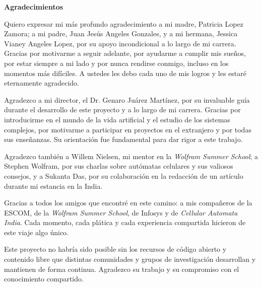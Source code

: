 \thispagestyle{empty}

\vspace*{1cm}
{\centering \Large \textbf{Agradecimientos}\par}
\vspace{0.8cm}

Quiero expresar mi más profundo agradecimiento a mi madre, Patricia Lopez Zamora; a mi padre, Juan Jesús Angeles Gonzales, y a mi hermana, Jessica Vianey Angeles Lopez, por su apoyo incondicional a lo largo de mi carrera. Gracias por motivarme a seguir adelante, por ayudarme a cumplir mis sueños, por estar siempre a mi lado y por nunca rendirse conmigo, incluso en los momentos más difíciles. A ustedes les debo cada uno de mis logros y les estaré eternamente agradecido.

Agradezco a mi director, el Dr. Genaro Juárez Martínez, por su invaluable guía durante el desarrollo de este proyecto y a lo largo de mi carrera. Gracias por introducirme en el mundo de la vida artificial y el estudio de los sistemas complejos, por motivarme a participar en proyectos en el extranjero y por todas sus enseñanzas. Su orientación fue fundamental para dar rigor a este trabajo.

Agradezco también a Willem Nielsen, mi mentor en la \textit{Wolfram Summer School}; a Stephen Wolfram, por sus charlas sobre autómatas celulares y sus valiosos consejos, y a Sukanta Das, por su colaboración en la redacción de un artículo durante mi estancia en la India.

Gracias a todos los amigos que encontré en este camino: a mis compañeros de la ESCOM, de la \textit{Wolfram Summer School}, de Infosys y de \textit{Cellular Automata India}. Cada momento, cada plática y cada experiencia compartida hicieron de este viaje algo único.

Este proyecto no habría sido posible sin los recursos de código abierto y contenido libre que distintas comunidades y grupos de investigación desarrollan y mantienen de forma continua. Agradezco su trabajo y su compromiso con el conocimiento compartido.
\clearpage
